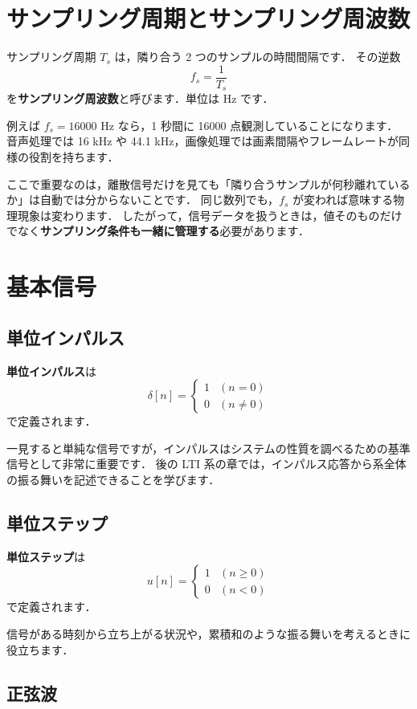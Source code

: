 \section{サンプリング周期とサンプリング周波数}

サンプリング周期 $T_s$ は，隣り合う 2 つのサンプルの時間間隔です．
その逆数
\[
f_s = \frac{1}{T_s}
\]
を\textbf{サンプリング周波数}と呼びます．単位は Hz です．

例えば $f_s = 16000$ Hz なら，1 秒間に 16000 点観測していることになります．
音声処理では 16 kHz や 44.1 kHz，画像処理では画素間隔やフレームレートが同様の役割を持ちます．

ここで重要なのは，離散信号だけを見ても「隣り合うサンプルが何秒離れているか」は自動では分からないことです．
同じ数列でも，$f_s$ が変われば意味する物理現象は変わります．
したがって，信号データを扱うときは，値そのものだけでなく\textbf{サンプリング条件も一緒に管理する}必要があります．


\section{基本信号}

\subsection{単位インパルス}

\textbf{単位インパルス}は
\[
\delta[n] =
\begin{cases}
1 & (n = 0) \\
0 & (n \neq 0)
\end{cases}
\]
で定義されます．

一見すると単純な信号ですが，インパルスはシステムの性質を調べるための基準信号として非常に重要です．
後の LTI 系の章では，インパルス応答から系全体の振る舞いを記述できることを学びます．


\subsection{単位ステップ}

\textbf{単位ステップ}は
\[
u[n] =
\begin{cases}
1 & (n \geq 0) \\
0 & (n < 0)
\end{cases}
\]
で定義されます．

信号がある時刻から立ち上がる状況や，累積和のような振る舞いを考えるときに役立ちます．


\subsection{正弦波}

